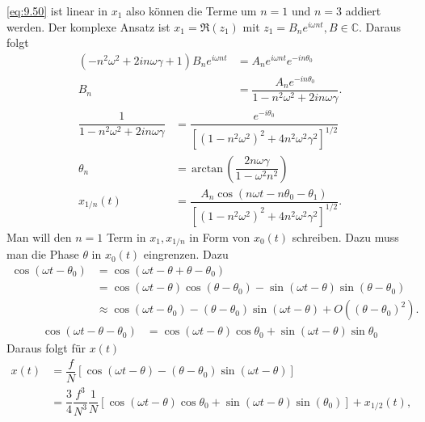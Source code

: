 \documentclass[a4paper,12pt]{article}
\numberwithin{equation}{section}
\begin{document}
\eqref{eq:9.50} ist linear in $x_1$ also können die Terme um $n=1$ und $n=3$ addiert werden. Der komplexe Ansatz ist $x_1=\mathfrak{R}\left(z_1\right)$ mit $z_1=B_ne ^{i\omega nt},B \in \mathbb{C}$. Daraus folgt
\begin{align} 
        \left(-n^2\omega ^2+2in\omega \gamma +1\right)B_ne ^{i\omega n t}&=A_ne ^{i\omega n t}e ^{-in \theta _0}\nonumber \\
        B_n&=\dfrac{A_ne ^{-in \theta _0}}{1-n^2\omega ^2+2i n \omega \gamma }\nonumber 
.\end{align} 
\begin{align} 
        \dfrac{1}{1-n^2\omega ^2+2 i n \omega \gamma }&=\dfrac{e ^{-i \theta _0}}{\left[\left(1-n^2\omega ^2\right)^2+4n^2\omega ^2\gamma ^2\right]^{1/2}}\nonumber \\
        \theta _n&=\,\text{arctan}\,\left(\dfrac{2n\omega \gamma }{1-\omega ^2n^2}\right)\label{eq:9.51}\\
        x_{1/n}\left(t\right)&=\dfrac{A_n\cos \left(n\omega t-n \theta _0-\theta _1\right)}{\left[\left(1-n^2\omega ^2\right)^2+4n^2\omega ^2\gamma ^2\right]^{1/2}}\nonumber 
.\end{align} 
Man will den $n=1$ Term in $x_1,x_{1/n}$ in Form von $x_0\left(t\right)$ schreiben. Dazu muss man die Phase $\theta $ in $x_0\left(t\right)$ eingrenzen. Dazu
\begin{align} 
        \cos \left(\omega t-\theta _0\right)&=\cos \left(\omega t-\theta +\theta -\theta _0\right)\nonumber \\
                                            &=\cos \left(\omega t-\theta \right)\cos \left(\theta -\theta _0\right)-\sin \left(\omega t-\theta \right)\sin \left(\theta -\theta _0\right)\nonumber \\
                                            &\approx \cos \left(\omega t-\theta _0\right)-\left(\theta -\theta _0\right)\sin \left(\omega t-\theta \right)+O\left(\left(\theta -\theta _0\right)^2\right)\nonumber 
.\end{align} 
\begin{align*} 
        \cos \left(\omega t-\theta -\theta _0\right)&=\cos \left(\omega t-\theta \right)\cos \theta _0+\sin \left(\omega t-\theta \right)\sin \theta _0
\end{align*} 
Daraus folgt für $x\left(t\right)$ 
\begin{align} 
        x\left(t\right)&=\dfrac{f}{N}\left[\cos \left(\omega t-\theta \right)-\left(\theta -\theta _0\right)\sin \left(\omega t-\theta \right)\right]\nonumber \\
                       &=\dfrac{3}{4}\dfrac{f^3}{N^3}\dfrac{1}{N}\left[\cos \left(\omega t-\theta \right)\cos \theta _0+\sin \left(\omega t-\theta \right)\sin \left(\theta _0\right)\right]+x_{1/2}\left(t\right)\nonumber 
,\end{align} 
\end{document}

